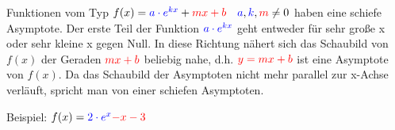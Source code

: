 Funktionen vom Typ \(f(x)=\textcolor{blue}{a\cdot e^{kx}}+\textcolor{red}{mx+b}\quad \textcolor{blue}{a},\textcolor{blue}{k}, \textcolor{red}{m}\neq 0\) haben eine schiefe Asymptote. Der erste Teil der Funktion \(\textcolor{blue}{a\cdot e^{kx}}\) geht entweder für sehr große x oder sehr kleine x gegen Null. In diese Richtung nähert sich das Schaubild von \(f(x)\) der Geraden \(\textcolor{red}{mx+b}\) beliebig nahe, d.h. \(\textcolor{red}{y=mx+b}\) ist eine Asymptote von \(f(x)\). Da das Schaubild der Asymptoten nicht mehr parallel zur x-Achse verläuft, spricht man von einer schiefen Asymptoten.

Beispiel: \(f(x)=\textcolor{blue}{2\cdot e^{x}}\textcolor{red}{-x-3}\)

\begin{minipage}{\linewidth}
\iftoggle{qrcode}{%
    \settototalheight{\imgheight}{\texttt{[image: \\eFkt/pics/schiefeAsymptote.png]}}%
    \setlength{\qrheight}{2.5cm}%
    \texttt{[image: \\eFkt/pics/schiefeAsymptote.png]}%
    \adjustbox{raise=\imgheight-\qrheight, lap=-\textwidth}{\makebox[0pt][l]{\href{https://www.geogebra.org/m/kmttcwtn}{\texttt{[image: \\eFkt/pics/schiefeAsymptotenQR.png]}}}}
}{%
    \texttt{[image: \\eFkt/pics/schiefeAsymptote.png]}
}%
\end{minipage}

\smallskip


